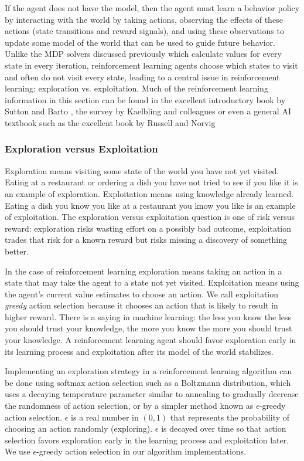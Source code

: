 If the agent does not have the model, then the agent must learn a behavior policy by interacting with the world by taking actions, observing the effects of these actions (state transitions and reward signals), and using these observations to update some model of the world that can be used to guide future behavior. Unlike the MDP solvers discussed previously which calculate values for every state in every iteration, reinforcement learning agents choose which states to visit and often do not visit every state, leading to a central issue in reinforcement learning: exploration vs. exploitation. Much of the reinforcement learning information in this section can be found in the excellent introductory book by Sutton and Barto \cite{sutton1998reinforcement}, the survey by Kaelbling and colleagues \cite{kaelbling1996reinforcement} or even a general AI textbook such as the excellent book by Russell and Norvig \cite{russell2003artificial}

\subsubsection{Exploration versus Exploitation}

Exploration means visiting some state of the world you have not yet visited. Eating at a restaurant or ordering a dish you have not tried to see if you like it is an example of exploration. Exploitation means using knowledge already learned. Eating a dish you know you like at a restaurant you know you like is an example of exploitation. The exploration versus exploitation question is one of risk versus reward: exploration risks wasting effort on a possibly bad outcome, exploitation trades that risk for a known reward but risks missing a discovery of something better.

In the case of reinforcement learning exploration means taking an action in a state that may take the agent to a state not yet visited. Exploitation means using the agent's current value estimates to choose an action. We call exploitation {\it greedy} action selection because it chooses an action that is likely to result in higher reward. There is a saying in machine learning: the less you know the less you should trust your knowledge, the more you know the more you should trust your knowledge. A reinforcement learning agent should favor exploration early in its learning process and exploitation after its model of the world stabilizes.

Implementing an exploration strategy in a reinforcement learning algorithm can be done using softmax action selection such as a Boltzmann distribution, which uses a decaying temperature parameter similar to annealing to gradually decrease the randomness of action selection, or by a simpler method known as $\epsilon$-greedy action selection.  $\epsilon$ is a real number in $(0, 1)$ that represents the probability of choosing an action randomly (exploring). $\epsilon$ is decayed over time so that action selection favors exploration early in the learning process and exploitation later. We use $\epsilon$-greedy action selection in our algorithm implementations.

